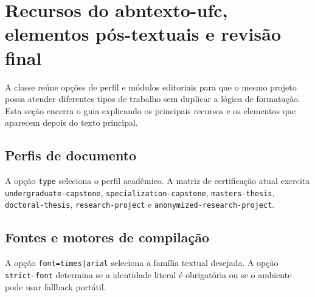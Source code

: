 \section{Recursos do abntexto-ufc, elementos pós-textuais e revisão final}\label{sec:recursos-finais}

A classe reúne opções de perfil e módulos editoriais para que o mesmo projeto possa atender diferentes tipos de trabalho sem duplicar a lógica de formatação. Esta seção encerra o guia explicando os principais recursos e os elementos que aparecem depois do texto principal.

\subsection{Perfis de documento}

A opção \texttt{type} seleciona o perfil acadêmico. A matriz de certificação atual exercita \texttt{undergraduate-capstone}, \texttt{specialization-capstone}, \texttt{masters-thesis}, \texttt{doctoral-thesis}, \texttt{research-project} e \texttt{anonymized-research-project}.



\subsection{Fontes e motores de compilação}

A opção \texttt{font=times|arial} seleciona a família textual desejada. A opção \texttt{strict-font} determina se a identidade literal é obrigatória ou se o ambiente pode usar fallback portátil.


